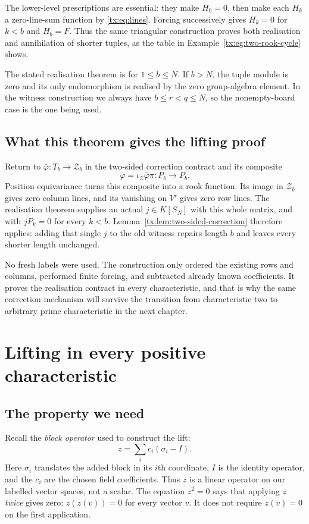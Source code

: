 \documentclass[11pt,a4paper,oneside,openany]{book}
\theoremstyle{definition}\newtheorem{definition}[theorem]{Definition}
\theoremstyle{remark}\newtheorem{remark}[theorem]{Remark}
\numberwithin{equation}{chapter}
\begin{document}
The lower-level prescriptions are essential: they make $H_0=0$, then make each $H_k$ a zero-line-sum function by \eqref{tx:eq:lines}. Forcing successively gives $H_k=0$ for $k<b$ and $H_b=F$. Thus the same triangular construction proves both realisation and annihilation of shorter tuples, as the table in Example~\ref{tx:eg:two-rook-cycle} shows.

The stated realisation theorem is for $1\le b\le N$. If $b>N$,
the tuple module is zero and its only endomorphism is realised by
the zero group-algebra element. In the witness construction we
always have $b\le r<q\le N$, so the nonempty-board case is the
one being used.

\section*{What this theorem gives the lifting proof}
Return to $\bar\varphi:T_b\to\mathcal Z_b$ in the two-sided correction contract and its composite
\[
             \varphi=\iota_{\mathcal Z}\bar\varphi\pi:P_b\to P_b.
\]
Position equivariance turns this composite into a rook function. Its image in
$\mathcal Z_b$ gives zero column lines, and its vanishing on $V'$
gives zero row lines. The realisation theorem supplies an actual
$j\in K[S_N]$ with this whole matrix, and with $jP_k=0$ for every
$k<b$. Lemma~\ref{tx:lem:two-sided-correction} therefore applies: adding that single $j$ to the old witness repairs length $b$ and leaves every shorter length unchanged.

No fresh labels were used. The construction only ordered the
existing rows and columns, performed finite forcing, and subtracted
already known coefficients. It proves the realisation contract in
every characteristic, and that is why the same correction mechanism
will survive the transition from characteristic two to arbitrary
prime characteristic in the next chapter.

\chapter{Lifting in every positive characteristic}\label{tx:sec:odd}
\label{tx:ch:prime}
\section*{The property we need}
Recall the \emph{block operator} used to construct the lift:
\[
                       z=\sum_i c_i(\sigma_i-I).
\]
Here $\sigma_i$ translates the added block in its $i$th coordinate,
$I$ is the identity operator, and the $c_i$ are the chosen field
coefficients. Thus $z$ is a linear operator on our labelled vector
spaces, not a scalar. The equation $z^2=0$ says that applying $z$
\emph{twice} gives zero: $z(z(v))=0$ for every vector $v$. It does
not require $z(v)=0$ on the first application.
\end{document}
